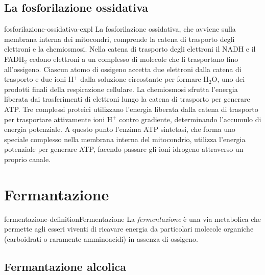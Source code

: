 \documentclass[preview]{standalone}
\begin{document}

\subsection{La fosforilazione ossidativa}

\begin{snippet}{fosforilazione-ossidativa-expl}
    La fosforilazione ossidativa, che avviene sulla membrana interna dei mitocondri, comprende
    la catena di trasporto degli elettroni e la chemiosmosi. Nella catena di trasporto degli
    elettroni il NADH e il FADH\({}_2\) cedono elettroni a un complesso di molecole che li trasportano
    fino all'ossigeno. Ciascun atomo di ossigeno accetta due elettroni dalla catena di trasporto
    e due ioni H\({}^+\) dalla soluzione circostante per formare H\({}_2\)O, uno dei prodotti finali della
    respirazione cellulare. La chemiosmosi sfrutta l'energia liberata dai trasferimenti di elettroni
    lungo la catena di trasporto per generare ATP. Tre complessi proteici utilizzano l'energia
    liberata dalla catena di trasporto per trasportare attivamente ioni H\({}^+\) contro gradiente,
    determinando l'accumulo di energia potenziale. A questo punto l'enzima ATP sintetasi, che
    forma uno speciale complesso nella membrana interna del mitocondrio, utilizza l'energia
    potenziale per generare ATP, facendo passare gli ioni idrogeno attraverso un proprio canale.
\end{snippet}


\section{Fermantazione}

\begin{snippetdefinition}{fermentazione-definition}{Fermentazione}
    La \textit{fermentazione} è una via metabolica che permette agli esseri viventi di ricavare energia da particolari molecole organiche (carboidrati o raramente amminoacidi) in assenza di ossigeno.
\end{snippetdefinition}

\subsection{Fermantazione alcolica}
\end{document}
